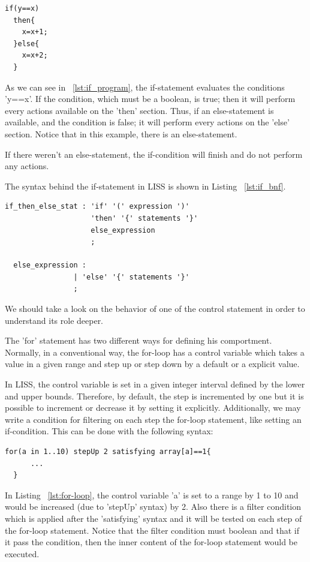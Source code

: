\documentclass[
  oneside,
  11pt, a4paper,
  footinclude=true,
  headinclude=true,
  cleardoublepage=empty
]{scrbook}
\begin{document}
\begin{lstlisting}[caption={LISS syntax of a if statement},label={lst:if_program}]
  if(y==x)
  then{
    x=x+1;
  }else{
    x=x+2;
  }
\end{lstlisting}

As we can see in ~\ref{lst:if_program}, the if-statement evaluates the conditions 'y==x'.
If the condition, which must be a boolean, is true; then it will perform every actions available on the 'then' section.
Thus, if an else-statement is available, and the condition is false; it will perform every actions on the 'else' section. Notice that in this example, there is an else-statement.

If there weren't an else-statement, the if-condition will finish and do not perform any actions.


The syntax behind the if-statement in LISS is shown in Listing ~\ref{lst:if_bnf}.



\begin{lstlisting}[caption={BNF of iterative statement in LISS},label={lst:if_bnf}]
  if_then_else_stat : 'if' '(' expression ')'
                    'then' '{' statements '}'
                    else_expression
                    ;

  else_expression :
                | 'else' '{' statements '}'
                ;
\end{lstlisting}

We should take a look on the behavior of one of the control statement in order to understand its role deeper.

The 'for' statement has two different ways for defining his comportment.
Normally, in a conventional way, the for-loop has a control variable which takes a value in a given range and step up or step down by a default or a explicit value.

In LISS, the control variable is set in a given integer interval defined by the lower and upper bounds. Therefore, by default, the step is incremented by one but it is possible to increment or decrease it by setting it explicitly.
Additionally, we may write a condition for filtering on each step the for-loop statement, like setting an if-condition.
This can be done with the following syntax:
\begin{lstlisting}[caption={LISS syntax of a for-loop statement},label={lst:for-loop}]
  for(a in 1..10) stepUp 2 satisfying array[a]==1{
	  ...
  }
\end{lstlisting}
In Listing ~\ref{lst:for-loop}, the control variable 'a' is set to a range by 1 to 10 and would be increased (due to 'stepUp' syntax) by 2. Also there is a filter condition which is applied after the 'satisfying' syntax and it will be tested on each step of the for-loop statement. Notice that the filter condition must boolean and that if it pass the condition, then the inner content of the for-loop statement would be executed. 
\end{document}
